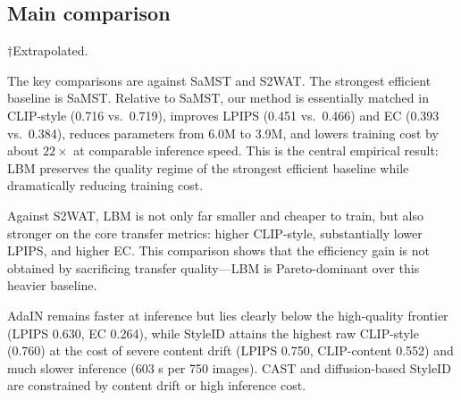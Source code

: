 ﻿\documentclass[letterpaper]{article}
\begin{document}
\subsection{Main comparison}
\begin{table}[t]
\centering
\caption{Strict-750 comparison with efficiency. $\uparrow$ = higher is better, $\downarrow$ = lower is better. Inference time end-to-end for 750 images. Training times marked $\dagger$ are extrapolated.}
\label{tab:main}
\small
\setlength{\tabcolsep}{5pt}
\smallskip
\footnoterule\small
$\dagger$Extrapolated.
\end{table}

The key comparisons are against SaMST and S2WAT. The strongest efficient baseline is SaMST. Relative to SaMST, our method is essentially matched in CLIP-style (0.716 vs.\ 0.719), improves LPIPS (0.451 vs.\ 0.466) and EC (0.393 vs.\ 0.384), reduces parameters from 6.0M to 3.9M, and lowers training cost by about $22\times$ at comparable inference speed. This is the central empirical result: LBM preserves the quality regime of the strongest efficient baseline while dramatically reducing training cost.

Against S2WAT, LBM is not only far smaller and cheaper to train, but also stronger on the core transfer metrics: higher CLIP-style, substantially lower LPIPS, and higher EC. This comparison shows that the efficiency gain is not obtained by sacrificing transfer quality---LBM is Pareto-dominant over this heavier baseline.

AdaIN remains faster at inference but lies clearly below the high-quality frontier (LPIPS 0.630, EC 0.264), while StyleID attains the highest raw CLIP-style (0.760) at the cost of severe content drift (LPIPS 0.750, CLIP-content 0.552) and much slower inference (603 s per 750 images). CAST and diffusion-based StyleID are constrained by content drift or high inference cost.
\end{document}
